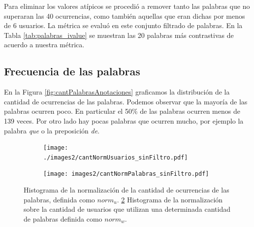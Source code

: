 Para eliminar los valores atípicos se procedió a remover tanto las palabras que no superaran las 40 ocurrencias, como también aquellas que eran dichas por menos de 6 usuarios. La métrica se evaluó en este conjunto filtrado de palabras. En la Tabla \ref{tab:palabras_ivalue} se muestran las 20 palabras más contrastivas de acuerdo a nuestra métrica.

\subsection{Frecuencia de las palabras}
\label{sub: frecuenciaPalabras}
En la Figura \ref{fig:cantPalabrasAnotaciones} graficamos la distribución de la cantidad de ocurrencias de las palabras. Podemos observar que la mayoría de las palabras ocurren poco. En particular el 50\% de las palabras ocurren menos de 139 veces. Por otro lado hay pocas palabras que ocurren mucho, por ejemplo la palabra \textit{que} o la preposición \textit{de}.


\begin{figure}[!ht]\centering
  \begin{subfigure}[t]{0.49\textwidth}
    \texttt{[image: ./images2/cantNormUsuarios\_sinFiltro.pdf]}
    \caption{} 
    \label{fig:cantNormUsuarios} 
   \end{subfigure}
   \begin{subfigure}[t]{0.49\textwidth}
    \texttt{[image: images2/cantNormPalabras\_sinFiltro.pdf]}
    \caption{} 
    \label{fig:cantNormPalabras} 
   \end{subfigure}
   \caption{ Histograma de la normalización de la cantidad de ocurrencias de las palabras, definida como $norm_u$. \ref{fig:cantNormPalabras} Histograma de la normalización sobre la cantidad de usuarios que utilizan una determinada cantidad de palabras definida como $norm_w$.}
   \label{fig:cantNormFig}
\end{figure}



